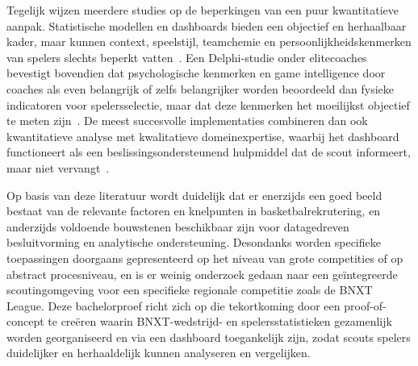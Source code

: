 Tegelijk wijzen meerdere studies op de beperkingen van een puur kwantitatieve
aanpak. Statistische modellen en dashboards bieden een objectief en herhaalbaar
kader, maar kunnen context, speelstijl, teamchemie en persoonlijkheidskenmerken
van spelers slechts beperkt vatten~\autocite{han2023basketball}. Een Delphi-studie
onder elitecoaches bevestigt bovendien dat psychologische kenmerken en game
intelligence door coaches als even belangrijk of zelfs belangrijker worden beoordeeld
dan fysieke indicatoren voor spelersselectie, maar dat deze kenmerken het moeilijkst
objectief te meten zijn~\autocite{Rogers2021}. De meest succesvolle implementaties
combineren dan ook kwantitatieve analyse met kwalitatieve domeinexpertise, waarbij
het dashboard functioneert als een beslissingsondersteunend hulpmiddel dat de scout
informeert, maar niet vervangt~\autocite{banucha2025strategic}.

Op basis van deze literatuur wordt duidelijk dat er enerzijds een goed beeld bestaat
van de relevante factoren en knelpunten in basketbalrekrutering, en anderzijds
voldoende bouwstenen beschikbaar zijn voor datagedreven besluitvorming en
analytische ondersteuning. Desondanks worden specifieke toepassingen doorgaans
gepresenteerd op het niveau van grote competities of op abstract procesniveau, en
is er weinig onderzoek gedaan naar een geïntegreerde scoutingomgeving voor een
specifieke regionale competitie zoals de BNXT League. Deze bachelorproef richt
zich op die tekortkoming door een proof-of-concept te creëren waarin
BNXT-wedstrijd- en spelersstatistieken gezamenlijk worden georganiseerd en via
een dashboard toegankelijk zijn, zodat scouts spelers duidelijker en herhaaldelijk
kunnen analyseren en vergelijken.